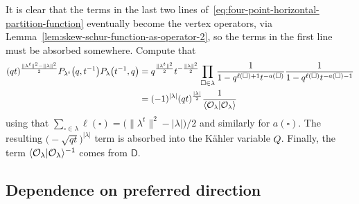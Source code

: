 \documentclass[10pt,a4paper]{amsart}
\numberwithin{equation}{section}
\newcommand{\cO}{\mathcal{O}}
\newcommand{\sD}{\mathsf{D}}
\DeclarePairedDelimiter{\inner}{\langle}{\rangle}
\begin{document}
\begin{MyParagraph}
It is clear that the terms in the last two lines of~\eqref{eq:four-point-horizontal-partition-function} eventually become
the vertex operators, via Lemma~\ref{lem:skew-schur-function-as-operator-2}, so the terms in the
first line must be absorbed somewhere. Compute that
 \begin{align}
 (qt)^{\frac{\|\lambda^t\|^2 - \|\lambda\|^2}{2}} P_{\lambda^t}\big(q,t^{-1}\big) P_{\lambda}\big(t^{-1},q\big)
 &= q^{\frac{\|\lambda^t\|^2}{2}}t^{-\frac{\|\lambda\|^2}{2}} \prod_{\square \in \lambda} \frac{1}{1 - q^{\ell(\square)+1} t^{-a(\square)}} \frac{1}{1 - q^{\ell(\square)} t^{-a(\square)-1}} \nonumber\\
 &= (-1)^{|\lambda|} (qt)^{\frac{|\lambda|}{2}} \frac{1}{\inner{\cO_\lambda | \cO_\lambda}} \label{eq:four-point-macdonald-factors}
 \end{align}
using that $\sum_{\square \in \lambda} \ell(\square) = \big(\|\lambda^t\|^2
- |\lambda|\big)/2$ and similarly for $a(\square)$. The resulting
$\big({-}\sqrt{qt}\big)^{|\lambda|}$ term is absorbed into the K\"ahler variable
$Q$. Finally, the term $\inner{\cO_\lambda | \cO_\lambda}^{-1}$ comes
from $\sD$.
\end{MyParagraph}


\subsection{Dependence on preferred direction}\label{sec:dependence-on-preferred-direction}
\end{document}
